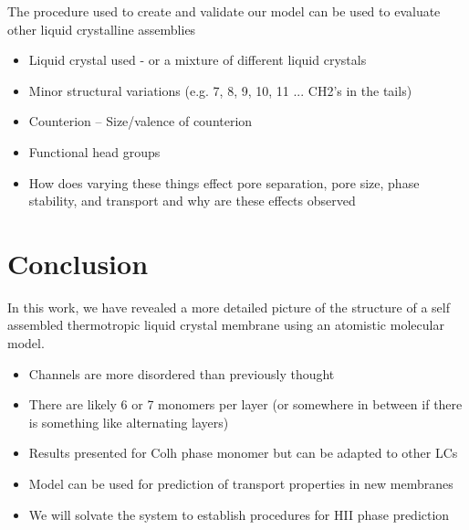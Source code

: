 \documentclass{article}
\begin{document}
	The procedure used to create and validate our model can be used to evaluate other liquid crystalline assemblies
		\begin{itemize}
			\item Liquid crystal used - or a mixture of different liquid crystals
			\item Minor structural variations (e.g. 7, 8, 9, 10, 11 ... CH2's in the tails)
			\item Counterion -- Size/valence of counterion
			\item Functional head groups
			\item How does varying these things effect pore separation, pore size, phase stability, and transport and why are these effects observed
		\end{itemize} 
		
	\section{Conclusion}

	In this work, we have revealed a more detailed picture of the structure of a self assembled thermotropic liquid crystal membrane using an atomistic molecular model.
	\begin{itemize}
		\item Channels are more disordered than previously thought
		\item There are likely 6 or 7 monomers per layer (or somewhere in between if there is something like alternating layers)
		\item Results presented for Colh phase monomer but can be adapted to other LCs
		\item Model can be used for prediction of transport properties in new membranes
		\item We will solvate the system to establish procedures for HII phase prediction
	\end{itemize}
	
	
\end{document}
